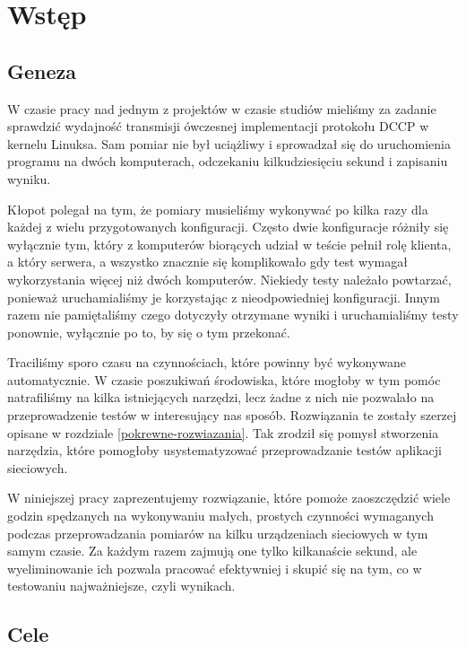 \documentclass[00-praca-magisterska.tex]{subfiles}
\begin{document}
\chapter{Wstęp}
\label{wstep}

\section{Geneza}
\label{geneza}

W czasie pracy nad jednym z projektów w czasie studiów mieliśmy za zadanie
sprawdzić wydajność transmisji ówczesnej implementacji protokołu DCCP w kernelu
Linuksa.  Sam pomiar nie był uciążliwy i sprowadzał się do uruchomienia
programu na dwóch komputerach, odczekaniu kilkudziesięciu sekund i zapisaniu
wyniku.

Kłopot polegał na tym, że pomiary musieliśmy wykonywać po kilka razy dla
każdej z wielu przygotowanych konfiguracji. Często dwie konfiguracje różniły się
wyłącznie tym, który z komputerów biorących udział w teście pełnił rolę klienta,
a który serwera, a wszystko znacznie się komplikowało gdy test wymagał
wykorzystania więcej niż dwóch komputerów. Niekiedy testy należało powtarzać,
ponieważ uruchamialiśmy je korzystając z nieodpowiedniej konfiguracji. Innym
razem nie pamiętaliśmy czego dotyczyły otrzymane wyniki i uruchamialiśmy testy
ponownie, wyłącznie po to, by się o tym przekonać.

Traciliśmy sporo czasu na czynnościach, które powinny być wykonywane
automatycznie. W czasie poszukiwań środowiska, które mogłoby w tym pomóc
natrafiliśmy na kilka istniejących narzędzi, lecz żadne z nich nie pozwalało
na przeprowadzenie testów w interesujący nas sposób. Rozwiązania te zostały
szerzej opisane w rozdziale \ref{pokrewne-rozwiazania}. Tak
zrodził się pomysł stworzenia narzędzia, które pomogłoby usystematyzować
przeprowadzanie testów aplikacji sieciowych.

W niniejszej pracy zaprezentujemy rozwiązanie, które pomoże zaoszczędzić wiele
godzin spędzanych na wykonywaniu małych, prostych czynności wymaganych podczas
przeprowadzania pomiarów na kilku urządzeniach sieciowych w tym samym czasie.
Za każdym razem zajmują one tylko kilkanaście sekund, ale wyeliminowanie ich
pozwala pracować efektywniej i skupić się na tym, co w testowaniu
najważniejsze, czyli wynikach.

\section{Cele}
\label{cele}
\end{document}
